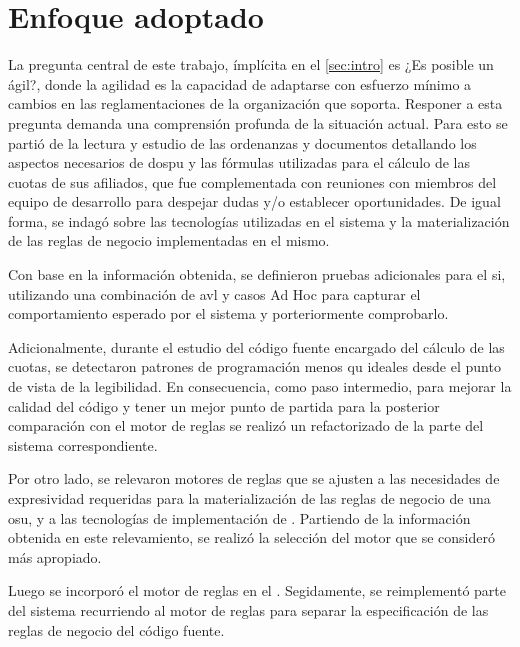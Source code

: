 \section{Enfoque adoptado}
La pregunta central de este trabajo, ímplícita en el \cref{sec:intro} es ¿Es
posible un {\SIOSU} ágil?, donde la agilidad es la capacidad de adaptarse con esfuerzo mínimo a cambios en las reglamentaciones de la organización que soporta. Responer a esta pregunta demanda una comprensión profunda de la situación actual.
Para esto se partió de la lectura y estudio de las ordenanzas y documentos detallando los aspectos necesarios de \acrshort{dospu} y las fórmulas utilizadas para el cálculo de las cuotas de sus afiliados, que fue complementada con reuniones con miembros del equipo de desarrollo {\SIDOSPU} para despejar dudas y/o establecer oportunidades. De igual forma, se indagó sobre las tecnologías utilizadas en el sistema y la materialización de las reglas de negocio implementadas en el mismo.

Con base en la información obtenida, se definieron pruebas adicionales para el \acrshort{si}, utilizando una combinación de \acrfull{avl} y casos Ad Hoc para capturar el comportamiento esperado por el sistema y porteriormente comprobarlo.

Adicionalmente, durante el estudio del código fuente encargado del cálculo de las cuotas, se detectaron patrones de programación menos qu ideales desde el punto de vista de la legibilidad. En consecuencia, como paso intermedio, para mejorar la calidad del código y tener un mejor punto de partida para la posterior comparación con el motor de reglas se realizó un refactorizado de la parte del sistema correspondiente.

Por otro lado, se relevaron motores de reglas que se ajusten a las necesidades de expresividad requeridas para la materialización de las reglas de negocio de una \acrshort{osu}, y a las tecnologías de implementación de {\SIDOSPU}. Partiendo de la información obtenida en este relevamiento, se realizó la selección del motor que se consideró más apropiado.

Luego se incorporó el motor de reglas en el {\SIDOSPU}. Segidamente, se reimplementó parte del sistema recurriendo al motor de reglas para separar la especificación de las reglas de negocio del código fuente.

